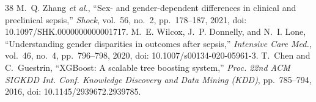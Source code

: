 \documentclass[preprint,12pt]{elsarticle}
\begin{document}
\begin{thebibliography}{38}
 M.~Q. Zhang \textit{et al.}, ``Sex- and gender-dependent differences in clinical and preclinical sepsis,'' \textit{Shock}, vol.~56, no.~2, pp.~178--187, 2021, doi: 10.1097/SHK.0000000000001717.
 M.~E. Wilcox, J.~P. Donnelly, and N.~I. Lone, ``Understanding gender disparities in outcomes after sepsis,'' \textit{Intensive Care Med.}, vol.~46, no.~4, pp.~796--798, 2020, doi: 10.1007/s00134-020-05961-3.
 T.~Chen and C.~Guestrin, ``XGBoost: A scalable tree boosting system,'' \textit{Proc. 22nd ACM SIGKDD Int. Conf. Knowledge Discovery and Data Mining (KDD)}, pp.~785--794, 2016, doi: 10.1145/2939672.2939785.
\end{thebibliography}
\end{document}
